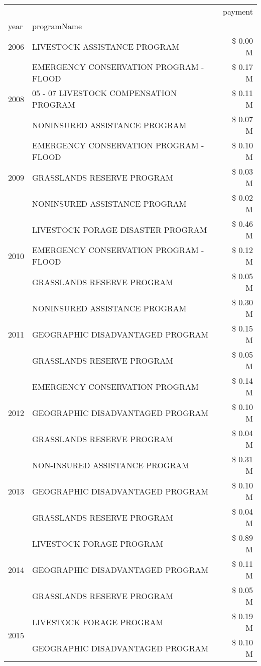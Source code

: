 \begin{tabular}{llr}
\toprule
 &  & payment \\
year & programName &  \\
\midrule
2006 & LIVESTOCK ASSISTANCE PROGRAM & \$ 0.00 M \\
\cline{1-3}
\multirow[t]{3}{*}{2008} & EMERGENCY CONSERVATION PROGRAM - FLOOD & \$ 0.17 M \\
 & 05 - 07 LIVESTOCK COMPENSATION PROGRAM & \$ 0.11 M \\
 & NONINSURED ASSISTANCE PROGRAM & \$ 0.07 M \\
\cline{1-3}
\multirow[t]{3}{*}{2009} & EMERGENCY CONSERVATION PROGRAM - FLOOD & \$ 0.10 M \\
 & GRASSLANDS RESERVE PROGRAM & \$ 0.03 M \\
 & NONINSURED ASSISTANCE PROGRAM & \$ 0.02 M \\
\cline{1-3}
\multirow[t]{3}{*}{2010} & LIVESTOCK FORAGE DISASTER  PROGRAM & \$ 0.46 M \\
 & EMERGENCY CONSERVATION PROGRAM - FLOOD & \$ 0.12 M \\
 & GRASSLANDS RESERVE PROGRAM & \$ 0.05 M \\
\cline{1-3}
\multirow[t]{3}{*}{2011} & NONINSURED ASSISTANCE PROGRAM & \$ 0.30 M \\
 & GEOGRAPHIC DISADVANTAGED PROGRAM & \$ 0.15 M \\
 & GRASSLANDS RESERVE PROGRAM & \$ 0.05 M \\
\cline{1-3}
\multirow[t]{3}{*}{2012} & EMERGENCY CONSERVATION PROGRAM & \$ 0.14 M \\
 & GEOGRAPHIC DISADVANTAGED PROGRAM & \$ 0.10 M \\
 & GRASSLANDS RESERVE PROGRAM & \$ 0.04 M \\
\cline{1-3}
\multirow[t]{3}{*}{2013} & NON-INSURED ASSISTANCE PROGRAM & \$ 0.31 M \\
 & GEOGRAPHIC DISADVANTAGED PROGRAM & \$ 0.10 M \\
 & GRASSLANDS RESERVE PROGRAM & \$ 0.04 M \\
\cline{1-3}
\multirow[t]{3}{*}{2014} & LIVESTOCK FORAGE PROGRAM & \$ 0.89 M \\
 & GEOGRAPHIC DISADVANTAGED PROGRAM & \$ 0.11 M \\
 & GRASSLANDS RESERVE PROGRAM & \$ 0.05 M \\
\cline{1-3}
\multirow[t]{3}{*}{2015} & LIVESTOCK FORAGE PROGRAM & \$ 0.19 M \\
 & GEOGRAPHIC DISADVANTAGED PROGRAM & \$ 0.10 M \\

\end{tabular}
